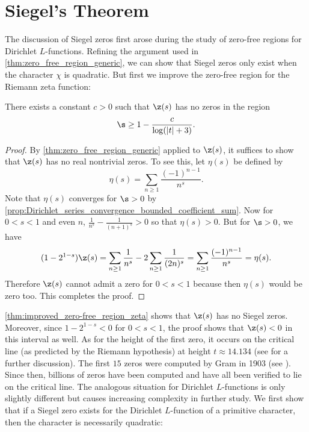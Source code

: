   \section{Siegel's Theorem}
    The discussion of Siegel zeros first arose during the study of zero-free regions for Dirichlet $L$-functions. Refining the argument used in \cref{thm:zero_free_region_generic}, we can show that Siegel zeros only exist when the character $\chi$ is quadratic. But first we improve the zero-free region for the Riemann zeta function:

    \begin{theorem}\label{thm:improved_zero-free_region_zeta}
      There exists a constant $c > 0$ such that $\z(s)$ has no zeros in the region
      \[
        \s \ge 1-\frac{c}{\log(|t|+3)}.
      \]
    \end{theorem}
    \begin{proof}
      By \cref{thm:zero_free_region_generic} applied to $\z(s)$, it suffices to show that $\z(s)$ has no real nontrivial zeros. To see this, let $\eta(s)$ be defined by
      \[
        \eta(s) = \sum_{n \ge 1}\frac{(-1)^{n-1}}{n^{s}}.
      \]
      Note that $\eta(s)$ converges for $\s > 0$ by \cref{prop:Dirichlet_series_convergence_bounded_coefficient_sum}. Now for $0 < s < 1$ and even $n$, $\frac{1}{n^{s}}-\frac{1}{(n+1)^{s}} > 0$ so that $\eta(s) > 0$. But for $\s > 0$, we have
      \[
        (1-2^{1-s})\z(s) = \sum_{n \ge 1}\frac{1}{n^{s}}-2\sum_{n \ge 1}\frac{1}{(2n)^{s}} = \sum_{n \ge 1}\frac{(-1)^{n-1}}{n^{s}} = \eta(s).
      \]
      Therefore $\z(s)$ cannot admit a zero for $0 < s < 1$ because then $\eta(s)$ would be zero too. This completes the proof.
    \end{proof}

    \cref{thm:improved_zero-free_region_zeta} shows that $\z(s)$ has no Siegel zeros. Moreover, since $1-2^{1-s} < 0$ for $0 < s < 1$, the proof shows that $\z(s) < 0$ in this interval as well. As for the height of the first zero, it occurs on the critical line (as predicted by the Riemann hypothesis) at height $t \approx 14.134$ (see \cite{davenport1980multiplicative} for a further discussion). The first $15$ zeros were computed by Gram in 1903 (see \cite{gram1903note}). Since then, billions of zeros have been computed and have all been verified to lie on the critical line. The analogous situation for Dirichlet $L$-functions is only slightly different but causes increasing complexity in further study. We first show that if a Siegel zero exists for the Dirichlet $L$-function of a primitive character, then the character is necessarily quadratic:

